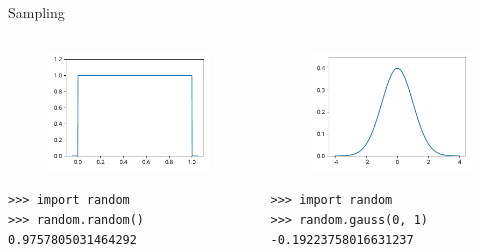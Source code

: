 \documentclass[12pt, aspectratio=149]{beamer}
\theoremstyle{plain}
\begin{document}
\begin{frame}[fragile]{Sampling}
\begin{columns}
\begin{column}{0.5\textwidth}
    \begin{center}
     \begin{figure}
     	\centering
     	\includegraphics[width=0.99\linewidth]{figures/uniform}
     \end{figure}
     \begin{verbatim}
>>> import random
>>> random.random()
0.9757805031464292
     \end{verbatim}
     \end{center}
\end{column}
\begin{column}{0.5\textwidth}  %
    \begin{center}
     \begin{figure}
     	\centering
     	\includegraphics[width=0.99\linewidth]{figures/normal}
     \end{figure}
      \begin{verbatim}
>>> import random
>>> random.gauss(0, 1)
-0.19223758016631237
      \end{verbatim}
     \end{center}
\end{column}
\end{columns}
\end{frame}
\end{document}
